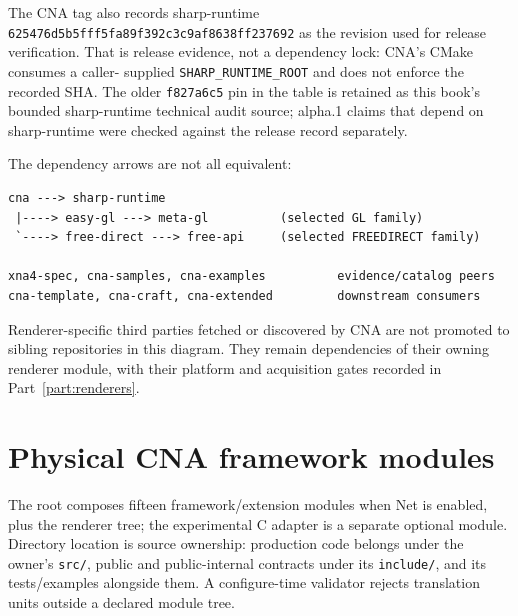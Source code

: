 The CNA tag also records sharp-runtime
\texttt{625476d5b5fff5fa89f392c3c9af8638\allowbreak ff237692} as the revision used for release
verification.  That is release evidence, not a dependency lock: CNA's CMake consumes a caller-
supplied \texttt{SHARP\_RUNTIME\_ROOT} and does not enforce the recorded SHA.  The older
\texttt{f827a6c5} pin in the table is retained as this book's bounded sharp-runtime technical
audit source; alpha.1 claims that depend on sharp-runtime were checked against the release
record separately.

The dependency arrows are not all equivalent:

\begin{verbatim}
cna ---> sharp-runtime
 |----> easy-gl ---> meta-gl          (selected GL family)
 `----> free-direct ---> free-api     (selected FREEDIRECT family)

xna4-spec, cna-samples, cna-examples          evidence/catalog peers
cna-template, cna-craft, cna-extended         downstream consumers
\end{verbatim}

Renderer-specific third parties fetched or discovered by CNA are not promoted to sibling
repositories in this diagram.  They remain dependencies of their owning renderer module, with
their platform and acquisition gates recorded in Part~\ref{part:renderers}.

\section{Physical CNA framework modules}

The root  composes fifteen framework/extension modules when Net is
enabled, plus the renderer tree; the experimental C adapter is a separate optional module.
Directory location is source ownership: production code belongs under the
owner's \texttt{src/}, public and public-internal contracts under its \texttt{include/}, and its
tests/examples alongside them.  A configure-time validator rejects translation units outside a
declared module tree.

